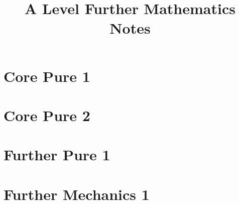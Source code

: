 \documentclass[oneside,fleqn,11pt]{book}
\title{A Level Further Mathematics Notes}
\begin{document}
\everymath{\displaystyle}
\maketitle
\tableofcontents

\part{Core Pure 1}
\setcounter{chapter}{0}


\part{Core Pure 2}
\setcounter{chapter}{0}


\part{Further Pure 1}
\setcounter{chapter}{0}


\part{Further Mechanics 1}
\setcounter{chapter}{0}

\end{document}
